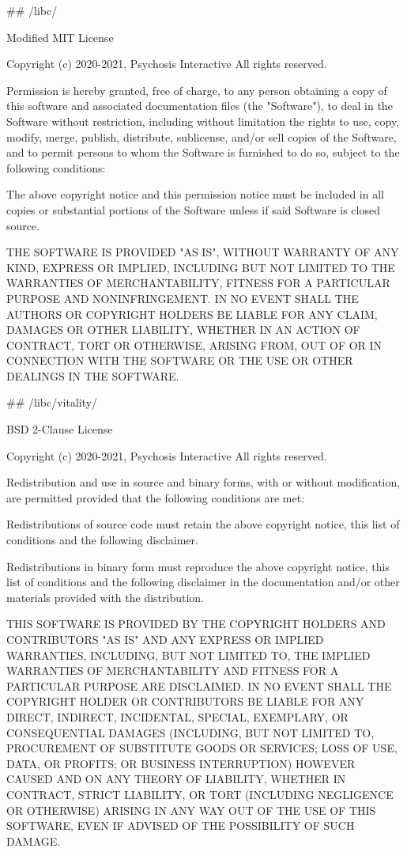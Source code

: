  \#\# /libc/ 
\begin{DoxyCode}
Modified MIT License

Copyright (c) 2020-2021, Psychosis Interactive All rights reserved.

Permission is hereby granted, free of charge, to any person obtaining a copy of this software and
       associated documentation files (the "Software"), to deal in the Software without restriction, including without
       limitation the rights to use, copy, modify, merge, publish, distribute, sublicense, and/or sell copies of the
       Software, and to permit persons to whom the Software is furnished to do so, subject to the following
       conditions:

The above copyright notice and this permission notice must be included in all copies or substantial
       portions of the Software unless if said Software is closed source.

THE SOFTWARE IS PROVIDED "AS IS", WITHOUT WARRANTY OF ANY KIND, EXPRESS OR IMPLIED, INCLUDING BUT NOT
       LIMITED TO THE WARRANTIES OF MERCHANTABILITY, FITNESS FOR A PARTICULAR PURPOSE AND NONINFRINGEMENT. IN NO EVENT
       SHALL THE AUTHORS OR COPYRIGHT HOLDERS BE LIABLE FOR ANY CLAIM, DAMAGES OR OTHER LIABILITY, WHETHER IN AN
       ACTION OF CONTRACT, TORT OR OTHERWISE, ARISING FROM, OUT OF OR IN CONNECTION WITH THE SOFTWARE OR THE USE OR
       OTHER DEALINGS IN THE SOFTWARE.
\end{DoxyCode}
 \#\# /libc/vitality/ 
\begin{DoxyCode}
BSD 2-Clause License

Copyright (c) 2020-2021, Psychosis Interactive All rights reserved.

Redistribution and use in source and binary forms, with or without modification, are permitted provided
       that the following conditions are met:

Redistributions of source code must retain the above copyright notice, this list of conditions and the
       following disclaimer.

Redistributions in binary form must reproduce the above copyright notice, this list of conditions and the
       following disclaimer in the documentation and/or other materials provided with the distribution.

THIS SOFTWARE IS PROVIDED BY THE COPYRIGHT HOLDERS AND CONTRIBUTORS "AS IS" AND ANY EXPRESS OR IMPLIED
       WARRANTIES, INCLUDING, BUT NOT LIMITED TO, THE IMPLIED WARRANTIES OF MERCHANTABILITY AND FITNESS FOR A
       PARTICULAR PURPOSE ARE DISCLAIMED. IN NO EVENT SHALL THE COPYRIGHT HOLDER OR CONTRIBUTORS BE LIABLE FOR ANY DIRECT,
       INDIRECT, INCIDENTAL, SPECIAL, EXEMPLARY, OR CONSEQUENTIAL DAMAGES (INCLUDING, BUT NOT LIMITED TO,
       PROCUREMENT OF SUBSTITUTE GOODS OR SERVICES; LOSS OF USE, DATA, OR PROFITS; OR BUSINESS INTERRUPTION) HOWEVER CAUSED
       AND ON ANY THEORY OF LIABILITY, WHETHER IN CONTRACT, STRICT LIABILITY, OR TORT (INCLUDING NEGLIGENCE OR
       OTHERWISE) ARISING IN ANY WAY OUT OF THE USE OF THIS SOFTWARE, EVEN IF ADVISED OF THE POSSIBILITY OF SUCH DAMAGE.
\end{DoxyCode}

